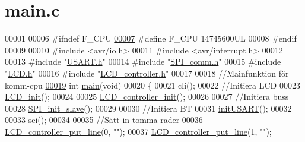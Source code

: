 \hypertarget{kommunikation_2komm__modul_2komm__modul_2main_8c_source}{}\section{main.\+c}
\label{kommunikation_2komm__modul_2komm__modul_2main_8c_source}

\begin{DoxyCode}
00001 
00006 \textcolor{preprocessor}{#ifndef F\_CPU}
\hypertarget{kommunikation_2komm__modul_2komm__modul_2main_8c_source.tex_l00007}{}\hyperlink{kommunikation_2komm__modul_2komm__modul_2main_8c_a43bafb28b29491ec7f871319b5a3b2f8}{00007} \textcolor{preprocessor}{#define F\_CPU 14745600UL}
00008 \textcolor{preprocessor}{#endif}
00009 
00010 \textcolor{preprocessor}{#include <avr/io.h>}
00011 \textcolor{preprocessor}{#include <avr/interrupt.h>}
00012 
00013 \textcolor{preprocessor}{#include "\hyperlink{_u_s_a_r_t_8h}{USART.h}"}
00014 \textcolor{preprocessor}{#include "\hyperlink{_s_p_i__comm_8h}{SPI\_comm.h}"}
00015 \textcolor{preprocessor}{#include "\hyperlink{_l_c_d_8h}{LCD.h}"}
00016 \textcolor{preprocessor}{#include "\hyperlink{_l_c_d__controller_8h}{LCD\_controller.h}"}
00017 
00018 \textcolor{comment}{//Mainfunktion för komm-cpu}
\hypertarget{kommunikation_2komm__modul_2komm__modul_2main_8c_source.tex_l00019}{}\hyperlink{kommunikation_2komm__modul_2komm__modul_2main_8c_a840291bc02cba5474a4cb46a9b9566fe}{00019} \textcolor{keywordtype}{int} \hyperlink{kommunikation_2komm__modul_2komm__modul_2main_8c_a840291bc02cba5474a4cb46a9b9566fe}{main}(\textcolor{keywordtype}{void})
00020 \{
00021     cli();
00022     \textcolor{comment}{//Initiera LCD}
00023     \hyperlink{_l_c_d_8c_a0742e25c23ca1096ceba081b98fd58ba}{LCD\_init}();
00024     
00025     \hyperlink{_l_c_d__controller_8c_acdf924af672d862f021f6b4ace2bcebd}{LCD\_controller\_init}();
00026     
00027     \textcolor{comment}{//Initiera buss}
00028     \hyperlink{_s_p_i__comm_8c_a9208b9a00dfa335b5dd56360ea5c7813}{SPI\_init\_slave}();
00029     
00030     \textcolor{comment}{//Initiera BT}
00031     \hyperlink{_u_s_a_r_t_8c_a4b46e2e6b871d0b0f138e61760b10fa2}{initUSART}();
00032     
00033     sei();
00034     
00035     \textcolor{comment}{//Sätt in tomma rader}
00036     \hyperlink{_l_c_d__controller_8c_ac9b4126229db48d14f07d3ea3178b48a}{LCD\_controller\_put\_line}(0, \textcolor{stringliteral}{""});
00037     \hyperlink{_l_c_d__controller_8c_ac9b4126229db48d14f07d3ea3178b48a}{LCD\_controller\_put\_line}(1, \textcolor{stringliteral}{""});

\end{DoxyCode}
